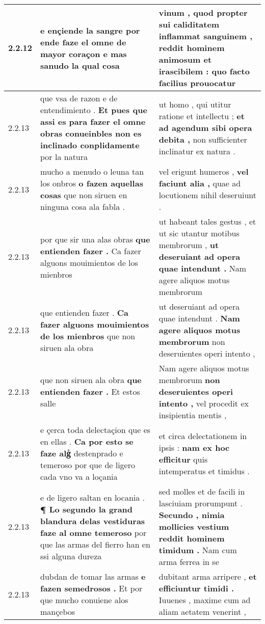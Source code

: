 \begin{tabular}{|p{1cm}|p{6.5cm}|p{6.5cm}|}
2.2.12 & e ençiende la sangre \textbf{ por ende faze el omne de mayor coraçon } e mas sanudo la qual cosa & vinum , quod propter sui caliditatem inflammat sanguinem , \textbf{ reddit hominem animosum et irascibilem : } quo facto facilius prouocatur \\\hline
2.2.13 & que vsa de razon e de entendimiento . \textbf{ Et pues que assi es para fazer el omne obras conueinbles non es inclinado conplidamente } por la natura & ut homo , qui utitur ratione et intellectu ; \textbf{ et ad agendum sibi opera debita , } non sufficienter inclinatur ex natura . \\\hline
2.2.13 & mucho a menudo o leuna tan los onbros \textbf{ o fazen aquellas cosas } que non siruen en ninguna cosa ala fabla . & vel erigunt humeros , \textbf{ vel faciunt alia , } quae ad locutionem nihil deseruiunt . \\\hline
2.2.13 & por que sir una alas obras \textbf{ que entienden fazer . } Ca fazer alguons mouimientos de los mienbros & ut habeant tales gestus , et ut sic utantur motibus membrorum , \textbf{ ut deseruiant ad opera quae intendunt . } Nam agere aliquos motus membrorum \\\hline
2.2.13 & que entienden fazer . \textbf{ Ca fazer alguons mouimientos de los mienbros } que non siruen ala obra & ut deseruiant ad opera quae intendunt . \textbf{ Nam agere aliquos motus membrorum } non deseruientes operi intento , \\\hline
2.2.13 & que non siruen ala obra \textbf{ que entienden fazer . } Et estos salle & Nam agere aliquos motus membrorum \textbf{ non deseruientes operi intento , } vel procedit ex insipientia mentis , \\\hline
2.2.13 & e çerca toda delectaçion que es en ellas . \textbf{ Ca por esto se faze algᷤ } destenprado e temeroso por que de ligero cada vno va a loçania & et circa delectationem in ipsis : \textbf{ nam ex hoc efficitur } quis intemperatus et timidus . \\\hline
2.2.13 & e de ligero saltan en locania . \textbf{ ¶ Lo segundo la grand blandura delas vestiduras faze al omne temeroso } por que las armas del fierro han en ssi alguna dureza & sed molles et de facili in lasciuiam prorumpunt . \textbf{ Secundo , nimia mollicies vestium reddit hominem timidum . } Nam cum arma ferrea in se \\\hline
2.2.13 & dubdan de tomar las armas \textbf{ e fazen semedrosos . } Et por que mucho conuiene alos mançebos & dubitant arma arripere , \textbf{ et efficiuntur timidi . } Iuuenes , maxime cum ad aliam aetatem venerint , \\\hline

\end{tabular}
